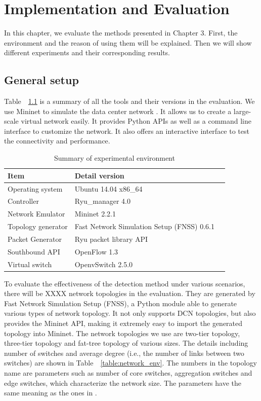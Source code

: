 \chapter{Implementation and Evaluation}
\label{Implementation_and_Evaluation}
In this chapter, we evaluate the methods presented in Chapter 3. First, the environment and the reason of using them will be explained. Then we will show different experiments and their corresponding results.

\section{General setup}
Table~~\ref{table:Experiment_table} is a summary of all the tools and their versions in the evaluation. We use Mininet to simulate the data center network \cite{Mininet}. It allows us to create a large-scale virtual network easily. It provides Python APIs as well as a command line interface to customize the network. It also offers an interactive interface to test the connectivity and performance.

\begin{table}[H]
\centering
\caption{Summary of experimental environment}
\begin{tabular}{|l|p{4cm}|p{4.5cm}}
\hline Item & Detail version \\
\hline
\hline Operating system & Ubuntu 14.04 x86\_64 \\
\hline Controller & Ryu\_manager 4.0 \\
\hline Network Emulator & Mininet 2.2.1 \\
\hline Topology generator & Fast Network Simulation Setup (FNSS) 0.6.1\\
\hline Packet Generator & Ryu packet library API \\
\hline Southbound API & OpenFlow 1.3 \\
\hline Virtual switch & OpenvSwitch 2.5.0 \\
\hline 
\end{tabular}
\label{table:Experiment_table}
\end{table}

To evaluate the effectiveness of the detection method under various scenarios, there will be XXXX network topologies  in the evaluation. They are generated by Fast Network Simulation Setup (FNSS), a Python module able to generate various types of network topology. It not only supports DCN topologies, but also provides the Mininet API, making it extremely easy to import the generated topology into Mininet. The network topologies we use are two-tier topology, three-tier topology and fat-tree topology of various sizes. The details including number of switches and average degree (i.e., the number of links between two switches) are shown in Table~~\ref{table:network_env}. The numbers in the topology name are parameters such as number of core switches, aggregation switches and edge switches, which characterize the network size. The parameters have the same meaning as the ones in \cite{FNSS} .

